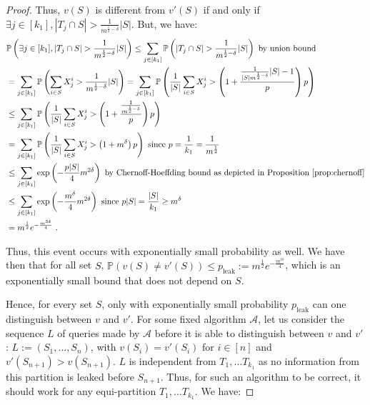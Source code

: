 \begin{proof}
    Thus, $v(S)$ is different from $v'(S)$ if and only if $\exists j \in [k_1], |T_j \cap S| > \frac{1}{m^{\frac{1}{2}-\delta}}|S|$. But, we have:
        \begin{equation}
      \begin{aligned}
        &\mathbb{P}\left(\exists j \in [k_1], |T_j \cap S| > \frac{1}{m^{\frac{1}{2}-\delta}}|S|\right) \leq \sum_{j \in [k_1]} \mathbb{P}\left(|T_j \cap S| > \frac{1}{m^{\frac{1}{2}-\delta}}|S|\right) \text{ by union bound}\\
        &=\sum_{j \in [k_1]} \mathbb{P}\left(\sum_{i \in S}X_j^i > \frac{1}{m^{\frac{1}{2}-\delta}}|S|\right)
        =\sum_{j \in [k_1]} \mathbb{P}\left(\frac{1}{|S|}\sum_{i \in S}X_j^i > \left(1 + \frac{\frac{1}{|S|m^{\frac{1}{2}-\delta}}{|S|}-1}{p}\right)p \right)\\
        &\leq \sum_{j \in [k_1]} \mathbb{P}\left(\frac{1}{|S|}\sum_{i \in S}X_j^i > \left(1 + \frac{\frac{1}{m^{\frac{1}{2}-\delta}}}{p}\right)p \right)\\
        &= \sum_{j \in [k_1]} \mathbb{P}\left(\frac{1}{|S|}\sum_{i \in S}X_j^i > \left(1 + m^{\delta}\right)p \right) \text{ since } p = \frac{1}{k_1} = \frac{1}{m^{\frac{1}{2}}}\\
        &\leq \sum_{j \in [k_1]}\exp\left(-\frac{p|S|}{4}m^{2\delta}\right) \text{ by Chernoff-Hoeffding bound as depicted in Proposition~\ref{prop:chernoff}}\\
        &\leq \sum_{j \in [k_1]}\exp\left(-\frac{m^{\delta}}{4}m^{2\delta}\right) \text{ since } p|S| = \frac{|S|}{k_1} \geq m^{\delta}\\
        &= m^{\frac{1}{2}}e^{-\frac{m^{3\delta}}{4}}\ .
      \end{aligned}
    \end{equation}


    Thus, this event occurs with exponentially small probability as well. We have then that for all set $S$,  $\mathbb{P}\left(v(S) \not= v'(S) \right) \leq p_{\text{leak}} := m^{\frac{1}{2}}e^{-\frac{m^{3\delta}}{4}}$, which is an exponentially small bound that does not depend on $S$.

    Hence, for every set $S$, only with exponentially small probability $p_{\text{leak}}$ can one distinguish between $v$ and $v'$. For some fixed algorithm $\mathcal{A}$, let us consider the sequence $L$ of queries made by $\mathcal{A}$ before it is able to distinguish between $v$ and $v'$: $L := (S_1, \ldots, S_n)$, with $v(S_i) = v'(S_i)$ for $i \in [n]$ and $v'(S_{n+1}) > v(S_{n+1})$. $L$ is independent from $T_1, \ldots T_{k_1}$ as no information from this partition is leaked before $S_{n+1}$. Thus, for such an algorithm to be correct, it should work for any equi-partition $T_1, \ldots T_{k_1}$. We have:


\end{proof}
